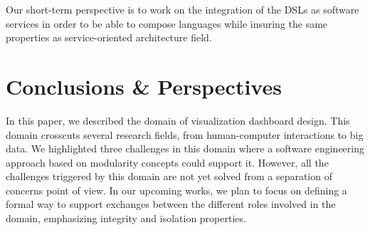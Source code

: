 \documentclass{acm_proc_article-sp}
\begin{document}
Our short-term perspective is to work on the integration of the DSLs
as software services in order to be able to compose languages while
insuring the same properties as service-oriented architecture field.

\section{Conclusions \& Perspectives}
In this paper, we described the domain of visualization dashboard
design. This domain crosscuts several research fields, from
human-computer interactions to big data. We highlighted three
challenges in this domain where a software engineering approach based
on modularity concepts could support it. However, all the challenges
triggered by this domain are not yet solved from a separation of
concerns point of view. In our upcoming works, we plan to focus on
defining a formal way to support exchanges between the different roles
involved in the domain, emphasizing integrity and isolation
properties.




%
\end{document}
